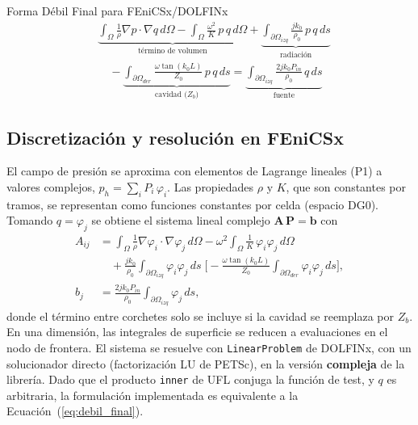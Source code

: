 \documentclass[11pt,a4paper]{article}
\begin{document}
\begin{infobox}{Forma Débil Final para FEniCSx/DOLFINx}
\begin{equation}
\begin{aligned}
&\underbrace{\int_\Omega \frac{1}{\rho}\nabla p\cdot\nabla q\,d\Omega-\int_\Omega \frac{\omega^2}{K}\,p\,q\,d\Omega}_{\text{término de volumen}}
+\underbrace{\int_{\partial\Omega_{izq}}\frac{jk_0}{\rho_0}\,p\,q\,ds}_{\text{radiación}}\\
&\quad-\underbrace{\int_{\partial\Omega_{der}}\frac{\omega\tan(k_0L)}{Z_0}\,p\,q\,ds}_{\text{cavidad ($Z_b$)}}
=\underbrace{\int_{\partial\Omega_{izq}}\frac{2jk_0P_{in}}{\rho_0}\,q\,ds}_{\text{fuente}}
\end{aligned}
\label{eq:debil_final}
\end{equation}
\end{infobox}

\subsection{Discretización y resolución en FEniCSx}
El campo de presión se aproxima con elementos de Lagrange lineales (P1) a valores complejos, $p_h=\sum_i P_i\,\varphi_i$. Las propiedades $\rho$ y $K$, que son constantes por tramos, se representan como funciones constantes por celda (espacio DG0). Tomando $q=\varphi_j$ se obtiene el sistema lineal complejo $\mathbf{A}\,\mathbf{P}=\mathbf{b}$ con
\begin{align}
A_{ij}&=\int_\Omega \frac{1}{\rho}\nabla\varphi_i\cdot\nabla\varphi_j\,d\Omega-\omega^2\!\int_\Omega\frac{1}{K}\,\varphi_i\varphi_j\,d\Omega \nonumber\\
&\quad+\frac{jk_0}{\rho_0}\int_{\partial\Omega_{izq}}\varphi_i\varphi_j\,ds\;\Big[-\frac{\omega\tan(k_0L)}{Z_0}\int_{\partial\Omega_{der}}\varphi_i\varphi_j\,ds\Big],\\
b_j&=\frac{2jk_0P_{in}}{\rho_0}\int_{\partial\Omega_{izq}}\varphi_j\,ds ,
\end{align}
donde el término entre corchetes solo se incluye si la cavidad se reemplaza por $Z_b$. En una dimensión, las integrales de superficie se reducen a evaluaciones en el nodo de frontera. El sistema se resuelve con \texttt{LinearProblem} de DOLFINx, con un solucionador directo (factorización LU de PETSc), en la versión \textbf{compleja} de la librería. Dado que el producto \texttt{inner} de UFL conjuga la función de test, y $q$ es arbitraria, la formulación implementada es equivalente a la Ecuación~(\ref{eq:debil_final}).
\end{document}
